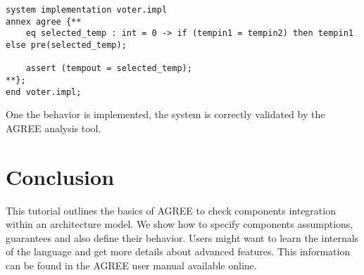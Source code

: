 \documentclass[times, 10pt]{article}
\begin{document}
\begin{lstlisting}
system implementation voter.impl
annex agree {**
	eq selected_temp : int = 0 -> if (tempin1 = tempin2) then tempin1 else pre(selected_temp);
	
    assert (tempout = selected_temp);
**}; 
end voter.impl;
\end{lstlisting}

    One the behavior is implemented, the system is correctly validated by the
    AGREE analysis tool.

    \section{Conclusion}
    This tutorial outlines the basics of AGREE to check components integration
    within an architecture model. We show how to specify components
    assumptions, guarantees and also define their behavior. Users might want to
    learn the internals of the language and get more details about advanced
    features. This information can be found in the AGREE user manual available
    online.
\end{document}
